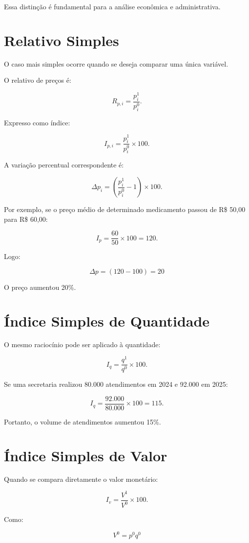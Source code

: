 Essa distinção é fundamental para a análise econômica e administrativa.


\section{Relativo Simples}

O caso mais simples ocorre quando se deseja comparar uma única variável.\vskip0.3cm

O relativo de preços é:

$$
R_{p,i}=
\frac{p_i^1}{p_i^0}.
$$

Expresso como índice:

$$
I_{p,i}=
\frac{p_i^1}{p_i^0}\times100.
$$

A variação percentual correspondente é:

$$
\Delta p_i=
\left(
\frac{p_i^1}{p_i^0}-1
\right)\times100.
$$

Por exemplo, se o preço médio de determinado medicamento passou de R\$ 50,00 para R\$ 60,00:

$$
I_p=
\frac{60}{50}\times100=120.
$$

Logo:

$$
\Delta p=(120-100)=20%
$$

O preço aumentou 20\%.


\newpage
\section{Índice Simples de Quantidade}

O mesmo raciocínio pode ser aplicado à quantidade:

$$
I_q=
\frac{q^1}{q^0}\times100.
$$

Se uma secretaria realizou 80.000 atendimentos em 2024 e 92.000 em 2025:

$$
I_q=
\frac{92.000}{80.000}\times100
=115.
$$

Portanto, o volume de atendimentos aumentou 15\%.




\section{Índice Simples de Valor}

Quando se compara diretamente o valor monetário:

$$
I_v=
\frac{V^1}{V^0}\times100.
$$

Como:

$$
V^0=p^0q^0
$$

